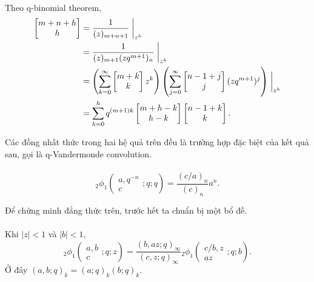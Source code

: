 \documentclass[11pt]{article}
\begin{document}
\paragraph{}
Theo q-binomial theorem,
\[
\begin{aligned}
  \left[\begin{matrix}m+n+h\\ h\end{matrix}\right]
  &=
  \frac{1}{(z)_{m+n+1}}\biggm|_{z^h}  \\
  &=
  \frac{1}{(z)_{m+1}(zq^{m+1})_n}\biggm|_{z^h}  \\
  &=
  \left(\sum_{k=0}^{\infty}
  \left[\begin{matrix}m+k\\ k\end{matrix}\right]z^k\right)
  \left(\sum_{j=0}^{\infty}
  \left[\begin{matrix}n-1+j\\ j\end{matrix}\right]
  (zq^{m+1})^j\right)\biggm|_{z^h} \\
  &=
  \sum_{k=0}^{h}
  q^{(m+1)k}
  \left[\begin{matrix}m+h-k\\ h-k\end{matrix}\right]
  \left[\begin{matrix}n-1+k\\ k\end{matrix}\right].
\end{aligned}
\]


Các đồng nhất thức trong hai hệ quả trên đều là trường hợp đặc biệt của kết
quả sau, gọi là q-Vandermonde convolution.

\paragraph{}
\[
  {}_2\phi_1
  \left(\begin{matrix}a,q^{-n}\\ c\end{matrix};q;q\right)
  =
  \frac{(c/a)_n}{(c)_n}a^n.
\]

Để chứng minh đẳng thức trên, trước hết ta chuẩn bị một bổ đề.

\paragraph{}
Khi \(|z|<1\) và \(|b|<1\),
\[
  {}_2\phi_1
  \left(\begin{matrix}a,b\\ c\end{matrix};q;z\right)
  =
  \frac{(b,az;q)_\infty}{(c,z;q)_\infty}
  {}_2\phi_1
  \left(\begin{matrix}c/b,z\\ az\end{matrix};q;b\right).
\]
Ở đây \((a,b;q)_k=(a;q)_k(b;q)_k\).
\end{document}
